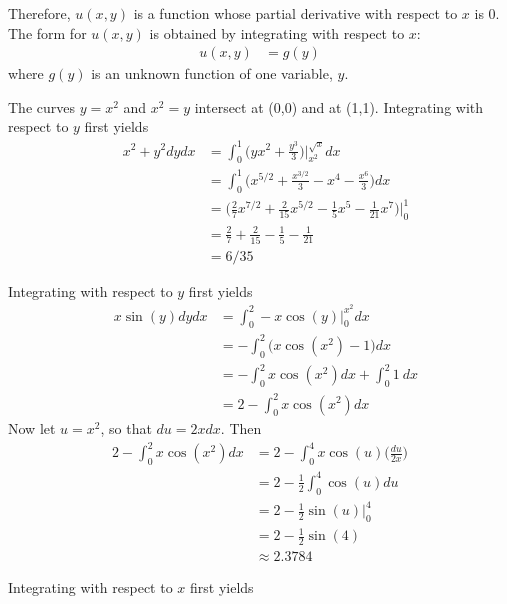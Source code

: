 \documentclass{article}
\begin{document}
Therefore, $u(x,y)$ is a function whose partial derivative with respect to $x$ is $0$. The  form for $u(x,y)$ is obtained by integrating with respect to $x$:
\begin{align*}
 u(x,y) &= g(y)
\end{align*}
where $g(y)$ is an unknown function of one variable, $y$. 
\EEN
\item %
The curves $y=x^2$ and $x^2=y$ intersect at (0,0) and at (1,1). Integrating with respect to $y$ first yields
\begin{align*} 
  \mathop{\int_0^1 \!\!\! \int_{x^2}^{\sqrt{x}}} x^2+y^2 dydx 
  &= \int_0^1 \Big(yx^2 + \frac{y^3}{3} \Big)\Big|_{x^2}^{\sqrt{x}} dx \\
  &= \int_0^1 \Big(x^{5/2} + \frac{x^{3/2}}{3} - x^4 - \frac{x^6}{3}\Big) dx \\
  &= \Big( \frac{2}{7} x^{7/2} + \frac{2}{15}x^{5/2} - \frac{1}{5}x^5 - \frac{1}{21}x^7\Big)\Big|_0^1 \\
  &= \frac{2}{7} + \frac{2}{15} - \frac{1}{5} - \frac{1}{21} \\
  &= 6/35
\end{align*}
\item %
\BEN 
\item Integrating with respect to $y$ first yields
\begin{align*} 
  \mathop{\int_0^2 \!\!\! \int_0^{x^2}} x\sin (y) dydx 
  &= \int_0^2 -x\cos(y)\Big|_0^{x^2} dx \\
  &= - \int_0^2 \Big(x\cos(x^2)-1\Big) dx \\
  &= - \int_0^2x\cos(x^2) dx +  \int_0^2 1 \ dx \\    
  &= 2 - \int_0^2x\cos(x^2) dx 
\end{align*}
Now let $u=x^2$, so that $du = 2xdx$. Then 
\begin{align*} 
  2 - \int_0^2x\cos(x^2) dx  
  &=  2 - \int_0^4 x\cos(u)\Big(\frac{du}{2x}\Big)\\
  &=  2 - \frac{1}{2} \int_0^4 \cos(u)du \\
  &=  2 - \frac{1}{2} \sin(u) \Big|_0^4 \\
  &=  2 - \frac{1}{2} \sin(4) \\
  &\approx 2.3784
\end{align*}
\item Integrating with respect to $x$ first yields
\end{document}
